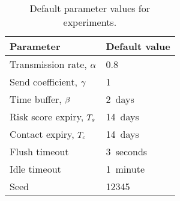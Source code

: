 \begin{table}[htbp]
  \centering
  \begin{tabular}{ll}
    \toprule
    Parameter & Default value \\
    \midrule
    Transmission rate, $\alpha$ & \num{0.8}\\
    Send coefficient, $\gamma$ & \num{1}\\
    Time buffer, $\beta$ & \qty{2}{days}\\
    Risk score expiry, $T_s$ & \qty{14}{days}\\
    Contact expiry, $T_c$ & \qty{14}{days}\\
    Flush timeout & \qty{3}{seconds}\\
    Idle timeout & \qty{1}{minute}\\
    Seed & \num{12345}\\
    \bottomrule
  \end{tabular}
  \caption[Default parameter values for experiments]{Default parameter values for experiments.}
  \label{tab:default-parameters}
\end{table}

